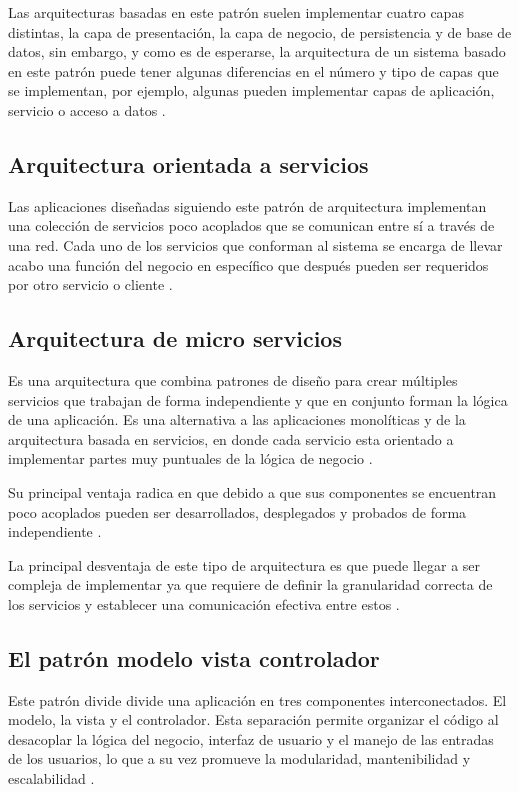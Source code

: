Las arquitecturas basadas en este patrón suelen implementar cuatro capas distintas, la capa de presentación, la capa de negocio, de persistencia y de base de datos, sin embargo, y como es de esperarse, la arquitectura de un sistema basado en este patrón puede tener algunas diferencias en el número y tipo de capas que se implementan, por ejemplo, algunas pueden implementar capas de aplicación, servicio o acceso a datos \cite{L07}.

\subsection{Arquitectura orientada a servicios}

Las aplicaciones diseñadas siguiendo este patrón de arquitectura implementan una colección de servicios poco acoplados que se comunican entre sí a través de una red.
Cada uno de los servicios que conforman al sistema se encarga de llevar acabo una función del negocio en específico que después pueden ser requeridos por otro servicio o cliente \cite{L09}.


\subsection{Arquitectura de micro servicios}

Es una arquitectura que combina patrones de diseño para crear múltiples servicios que trabajan de forma independiente y que en conjunto forman la lógica de una aplicación. Es una alternativa a las aplicaciones monolíticas y de la arquitectura basada en servicios, en donde cada servicio esta orientado a implementar partes muy puntuales de la lógica de negocio \cite{L08}.

Su principal ventaja radica en que debido a que sus componentes se encuentran poco acoplados pueden ser desarrollados, desplegados y probados de forma independiente \cite{L09}.

La principal desventaja de este tipo de arquitectura es que puede llegar a ser compleja de implementar ya que requiere de definir la granularidad correcta de los servicios y establecer una comunicación efectiva entre estos \cite{L07}.

\subsection{El patrón modelo vista controlador}

Este patrón divide divide una aplicación en tres componentes interconectados. El modelo, la vista y el controlador. Esta separación permite organizar el código al desacoplar la lógica del negocio, interfaz de usuario y el manejo de las entradas de los usuarios, lo que a su vez promueve la modularidad, mantenibilidad y escalabilidad \cite{L09}. 


